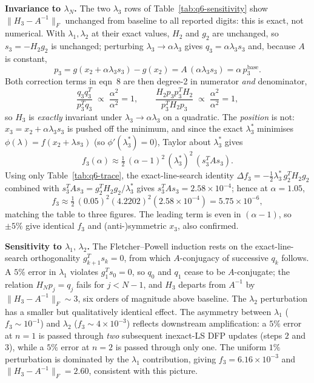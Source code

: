 \documentclass[11pt,a4paper]{article}
\begin{document}
\textbf{Invariance to \(\lambda_{N}\).}
The two \(\lambda_{3}\) rows of Table~\ref{tab:q6-sensitivity} show \(\|H_{3}-A^{-1}\|_{F}\) unchanged from baseline to all reported digits: this is exact, not numerical. With \(\lambda_{1},\lambda_{2}\) at their exact values, \(H_{2}\) and \(g_{2}\) are unchanged, so \(s_{3}=-H_{2}g_{2}\) is unchanged; perturbing \(\lambda_{3}\to\alpha\lambda_{3}\) gives \(q_{3}=\alpha\lambda_{3}s_{3}\) and, because \(A\) is constant,
\[
p_{3}=g(x_{2}+\alpha\lambda_{3}s_{3})-g(x_{2})=A\,(\alpha\lambda_{3}s_{3})=\alpha\,p_{3}^{\text{base}}.
\]
Both correction terms in eqn~8 are then degree-2 in numerator \emph{and} denominator,
\[
\frac{q_{3}q_{3}^{T}}{p_{3}^{T}q_{3}}\;\propto\;\frac{\alpha^{2}}{\alpha^{2}}=1,\qquad
\frac{H_{2}p_{3}p_{3}^{T}\!H_{2}}{p_{3}^{T}\!H_{2}p_{3}}\;\propto\;\frac{\alpha^{2}}{\alpha^{2}}=1,
\]
so \(H_{3}\) is \emph{exactly} invariant under \(\lambda_{3}\to\alpha\lambda_{3}\) on a quadratic. The \emph{position} is not: \(x_{3}=x_{2}+\alpha\lambda_{3}s_{3}\) is pushed off the minimum, and since the exact \(\lambda_{3}^{\ast}\) minimises \(\phi(\lambda)=f(x_{2}+\lambda s_{3})\) (so \(\phi'(\lambda_{3}^{\ast})=0\)), Taylor about \(\lambda_{3}^{\ast}\) gives
\[
f_{3}(\alpha)\approx\tfrac12\,(\alpha-1)^{2}\,(\lambda_{3}^{\ast})^{2}\,(s_{3}^{T}\!A s_{3}).
\]
Using only Table~\ref{tab:q6-trace}, the exact-line-search identity \(\Delta f_{3}=-\tfrac12\lambda_{3}^{\ast}\,g_{2}^{T}H_{2}g_{2}\) combined with \(s_{3}^{T}\!A s_{3}=g_{2}^{T}H_{2}g_{2}/\lambda_{3}^{\ast}\) gives \(s_{3}^{T}\!A s_{3}=2.58\!\times\!10^{-4}\); hence at \(\alpha=1.05\),
\[
f_{3}\approx\tfrac12\,(0.05)^{2}(4.2202)^{2}(2.58\!\times\!10^{-4})=5.75\!\times\!10^{-6},
\]
matching the table to three figures. The leading term is even in \((\alpha-1)\), so \(\pm 5\%\) give identical \(f_{3}\) and (anti-)symmetric \(x_{3}\), also confirmed.

\textbf{Sensitivity to \(\lambda_{1},\,\lambda_{2}\).}
The Fletcher--Powell induction rests on the exact-line-search orthogonality \(g_{k+1}^{T}s_{k}=0\), from which \(A\)-conjugacy of successive \(q_{k}\) follows. A \(5\%\) error in \(\lambda_{1}\) violates \(g_{1}^{T}s_{0}=0\), so \(q_{0}\) and \(q_{1}\) cease to be \(A\)-conjugate; the relation \(H_{N}p_{j}=q_{j}\) fails for \(j<N-1\), and \(H_{3}\) departs from \(A^{-1}\) by \(\|H_{3}-A^{-1}\|_{F}\sim 3\), six orders of magnitude above baseline. The \(\lambda_{2}\) perturbation has a smaller but qualitatively identical effect. The asymmetry between \(\lambda_{1}\) (\(f_{3}\sim 10^{-1}\)) and \(\lambda_{2}\) (\(f_{3}\sim 4\!\times\!10^{-3}\)) reflects downstream amplification: a \(5\%\) error at \(n=1\) is passed through \emph{two} subsequent inexact-LS DFP updates (steps \(2\) and \(3\)), while a \(5\%\) error at \(n=2\) is passed through only one. The uniform \(1\%\) perturbation is dominated by the \(\lambda_{1}\) contribution, giving \(f_{3}=6.16\!\times\!10^{-3}\) and \(\|H_{3}-A^{-1}\|_{F}=2.60\), consistent with this picture.
\end{document}
